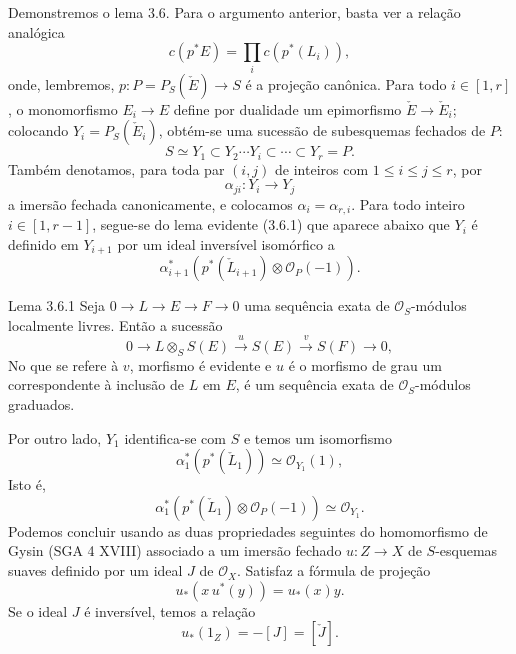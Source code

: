 Demonstremos o lema 3.6. Para o argumento anterior, basta ver a relação analógica
\[
c(p^*E)=\prod_i c(p^*(L_i)),
\]
onde, lembremos, $p:P=P_S(\check E)\to S$ é a projeção canônica. Para todo $i\in[1,r]$, o monomorfismo $E_i\to E$ define por dualidade um epimorfismo $\check E\to\check E_i$; colocando $Y_i=P_S(\check E_i)$, obtém-se uma sucessão de subesquemas fechados de $P$:
\[
S\simeq Y_1\subset Y_2\cdots Y_i\subset\cdots\subset Y_r=P.
\]
Também denotamos, para toda par $(i,j)$ de inteiros com $1\le i\le j\le r$, por
\[
\alpha_{ji}:Y_i\to Y_j
\]
a imersão fechada canonicamente, e colocamos $\alpha_i=\alpha_{r,i}$. Para todo inteiro $i\in[1,r-1]$, segue-se do lema evidente (3.6.1) que aparece abaixo que $Y_i$ é definido em $Y_{i+1}$ por um ideal inversível isomórfico a
\[
\alpha_{i+1}^*(p^*(\check L_{i+1})\otimes\mathcal O_P(-1)).
\]

\begin{statement}{Lema 3.6.1}
Seja $0\to L\to E\to F\to0$ uma sequência exata de $\mathcal O_S$-módulos localmente livres. Então a sucessão
\[
0\to L\otimes_S S(E)\xrightarrow{u}S(E)\xrightarrow{v}S(F)\to0,
\]
No que se refere à $v$, morfismo é evidente e $u$ é o morfismo de grau um correspondente à inclusão de $L$ em $E$, é um sequência exata de $\mathcal O_S$-módulos graduados.
\end{statement}

Por outro lado, $Y_1$ identifica-se com $S$ e temos um isomorfismo
\[
\alpha_1^*(p^*(\check L_1))\simeq\mathcal O_{Y_1}(1),
\]
Isto é,
\[
\alpha_1^*(p^*(\check L_1)\otimes\mathcal O_P(-1))\simeq \mathcal O_{Y_1}.
\tag{3.6.2}
\]
Podemos concluir usando as duas propriedades seguintes do homomorfismo de Gysin (SGA 4 XVIII) associado a um imersão fechado $u:Z\to X$ de $S$-esquemas suaves definido por um ideal $J$ de $\mathcal O_X$. Satisfaz a fórmula de projeção
\[
u_*(x\,u^*(y))=u_*(x)y.
\]
Se o ideal $J$ é inversível, temos a relação
\[
u_*(1_Z)=-[J]=[\check J].
\]
